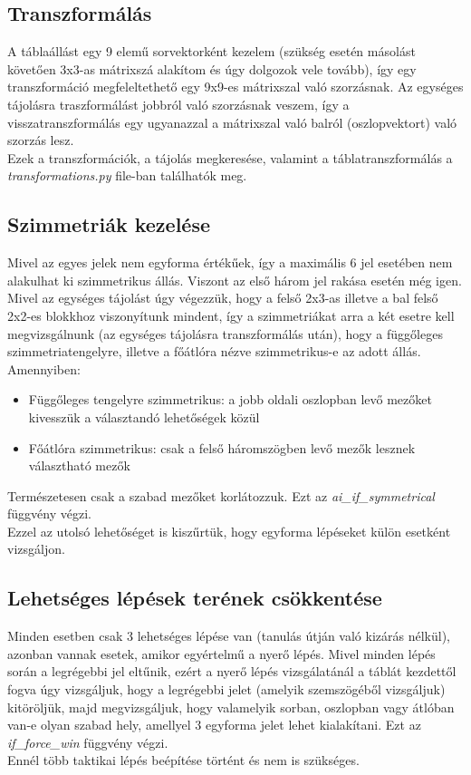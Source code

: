 \documentclass[a4paper, 11pt]{article}
\begin{document}
\pagebreak
\subsection{Transzformálás}
\indent A táblaállást egy 9 elemű sorvektorként kezelem (szükség esetén másolást követően 3x3-as mátrixszá alakítom és úgy dolgozok vele tovább), így egy transzformáció megfeleltethető egy 9x9-es mátrixszal való szorzásnak. Az egységes tájolásra traszformálást jobbról való szorzásnak veszem, így a visszatranszformálás egy ugyanazzal a mátrixszal való balról (oszlopvektort) való szorzás lesz. \\
\indent Ezek a transzformációk, a tájolás megkeresése, valamint a táblatranszformálás a \mbox{\emph{transformations.py}} file-ban találhatók meg.



\subsection{Szimmetriák kezelése}
\indent Mivel az egyes jelek nem egyforma értékűek, így a maximális 6 jel esetében nem alakulhat ki szimmetrikus állás. Viszont az első három jel rakása esetén még igen. Mivel az egységes tájolást úgy végezzük, hogy a felső 2x3-as illetve a bal felső 2x2-es blokkhoz viszonyítunk mindent, így a szimmetriákat arra a két esetre kell megvizsgálnunk (az egységes tájolásra transzformálás után), hogy a függőleges szimmetriatengelyre, illetve a főátlóra nézve szimmetrikus-e az adott állás. Amennyiben:
\begin{itemize}
    \item Függőleges tengelyre szimmetrikus: a jobb oldali oszlopban levő mezőket kivesszük a választandó lehetőségek közül
    \item Főátlóra szimmetrikus: csak a felső háromszögben levő mezők lesznek választható mezők
\end{itemize}
Természetesen csak a szabad mezőket korlátozzuk.  Ezt az \mbox{\emph{ai\_if\_symmetrical}} függvény végzi.\\
Ezzel az utolsó lehetőséget is kiszűrtük, hogy egyforma lépéseket külön esetként vizsgáljon.


\subsection{Lehetséges lépések terének csökkentése}
\indent Minden esetben csak 3 lehetséges lépése van (tanulás útján való kizárás nélkül), azonban vannak esetek, amikor egyértelmű a nyerő lépés. Mivel minden lépés során a legrégebbi jel eltűnik, ezért a nyerő lépés vizsgálatánál a táblát kezdettől fogva úgy vizsgáljuk, hogy a legrégebbi jelet (amelyik szemszögéből vizsgáljuk) kitöröljük, majd megvizsgáljuk, hogy valamelyik sorban, oszlopban vagy átlóban van-e olyan szabad hely, amellyel 3 egyforma jelet lehet kialakítani.
Ezt az \mbox{\emph{if\_force\_win}} függvény végzi.\\
Ennél több taktikai lépés beépítése történt és nem is szükséges.
\end{document}
